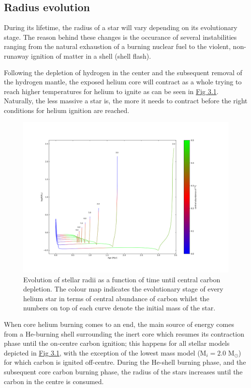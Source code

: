\documentclass[../../main/thesis_msc.tex]{subfiles}
\begin{document}
				
				\subsection{Radius evolution}
					During its lifetime, the radius of a star will vary depending on its evolutionary stage. The reason behind these changes is the occurance of several instabilities ranging from the natural exhaustion of a burning nuclear fuel to the violent, non-runaway ignition of matter in a shell (shell flash). 
					
					Following the depletion of hydrogen in the center and the subsequent removal of the hydrogen mantle, the exposed helium core will contract as a whole trying to reach higher temperatures for helium to ignite as can be seen in \hyperref[fig:radii_singles]{Fig 3.1}. Naturally, the less massive a star is, the more it needs to contract before the right conditions for helium ignition are reached.
				
					\begin{figure}[h]
						\centering
						\includegraphics[scale=0.4]{../figures/chapter3/radius_evolution_gradient.png}
						\caption{Evolution of stellar radii as a function of time until central carbon depletion. The colour map indicates the evolutionary stage of every helium star in terms of central abundance of carbon whilst the numbers on top of each curve denote the initial mass of the star.}
						\label{fig:radii_singles}
					\end{figure}
					
					When core helium burning comes to an end, the main source of energy comes from a He-burning shell surrounding the inert core which resumes its contraction phase until the on-centre carbon ignition; this happens for all stellar models depicted in \hyperref[fig:radii_singles]{Fig 3.1}, with the exception of the lowest mass model (M$_{i} = 2.0$ M$_{\odot}$) for which carbon is ignited off-centre. During the He-shell burning phase, and the subsequent core carbon burning phase, the radius of the stars increases until the carbon in the centre is consumed.
					
\end{document}
